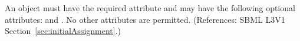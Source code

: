 An \InitialAssignment object must have the required attribute 
 and may have the following optional attributes:
 and .  No other attributes are permitted.  
(References: SBML L3V1 Section~\ref{sec:initialAssignment}.)
